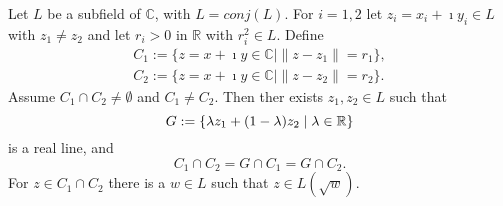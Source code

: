 \begin{lemma} 
    \label{lem:ConjClosed.Intersection_circle_circle}
    \leanok
    Let $L$ be a subfield of $\mathbb{C}$, with $L = conj(L)$. For $i = 1,2 $ let $z_i = x_i + \imath y_i \in L$ with $z_1 \ne z_2$ and let $r_i > 0$ in $\mathbb{R}$ with $r_i^2 \in L$. Define
    \begin{equation*} \begin{aligned}
        C_1 := \{z = x + \imath y \in \mathbb{C} \mid \|z - z_1\| = r_1\},\\
        C_2 := \{z = x + \imath y \in \mathbb{C} \mid \|z - z_2\| = r_2\}.
    \end{aligned} \end{equation*}
    Assume $C_1 \cap C_2 \ne \emptyset$ and $C_1 \ne C_2$. Then  ther  exists $z_1, z_2 \in L$ such that
     $$G := \{ \lambda z_1 + (1-\lambda) z_2 \mid \lambda \in \mathbb{R} \}$$ %
    is a real line, and $$ C_1 \cap C_2 = G \cap C_1 = G \cap C_2. $$
    For $z \in C_1 \cap C_2$ there is a $w \in L$ such that $z \in L(\sqrt{w})$.
\end{lemma}
